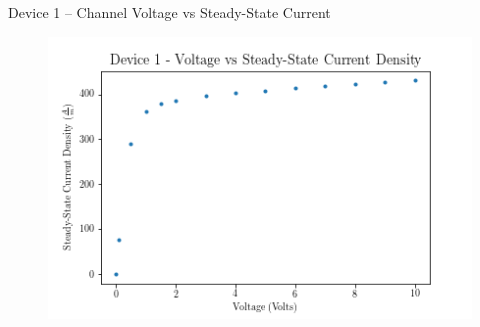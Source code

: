 \documentclass{beamer}
\begin{document}
\begin{frame}{Device 1 -- Channel Voltage vs Steady-State Current}
\begin{figure}
    \centering
    \includegraphics[scale=0.5]{Figures/Device_1/SteadyState.png}
    \label{fig:dev_1_steady}
\end{figure}
\end{frame}
 
\end{document}
